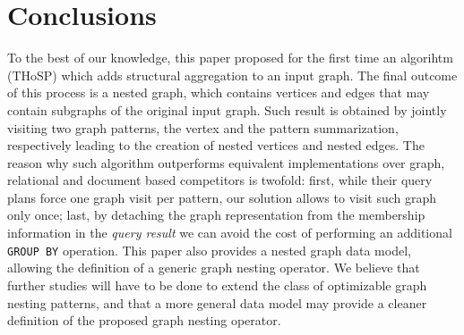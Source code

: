 
\section{Conclusions}
To the best of our knowledge, this paper proposed for the first time an algorihtm (THoSP) which adds structural aggregation to an input graph. The final outcome of this process is a nested graph, which contains vertices and edges that may contain subgraphs of the original input graph. Such result is obtained by jointly visiting two graph patterns, the vertex and the pattern summarization, respectively leading to the creation of nested vertices and nested edges. The reason why such algorithm outperforms equivalent implementations over graph, relational and document based competitors is twofold: first, while their query plans force one graph visit per pattern, our solution allows to visit such graph only once; last, by detaching the graph representation from the membership information in the \textit{query result} we can avoid the cost of performing an additional \texttt{GROUP BY} operation. This paper also provides a nested graph data model, allowing the definition of a generic graph nesting operator.
We believe that further studies will have to be done to extend the class of optimizable graph nesting patterns, and that a more general data model may provide a cleaner definition of the proposed graph nesting operator. 
